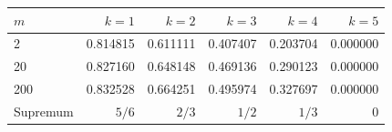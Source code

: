\begin{tabular}{lrrrrr}
\toprule
$m$ & $k=1$ & $k=2$ & $k=3$ & $k=4$ & $k=5$ \\
\midrule
2 & 0.814815 & 0.611111 & 0.407407 & 0.203704 & 0.000000 \\
20 & 0.827160 & 0.648148 & 0.469136 & 0.290123 & 0.000000 \\
200 & 0.832528 & 0.664251 & 0.495974 & 0.327697 & 0.000000 \\
\midrule
Supremum & $5/6$ & $2/3$ & $1/2$ & $1/3$ & $0$ \\
\bottomrule
\end{tabular}
